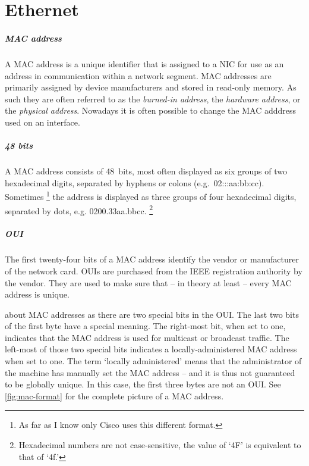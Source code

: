 \chapter{Ethernet}
\label{chap:ethernet}

\paragraph{\acs{MAC} address}
A \ac{MAC} address is a unique identifier that is assigned to a \ac{NIC} for use as an address in communication within a network segment.
\ac{MAC} addresses are primarily assigned by device manufacturers and stored in read-only memory.
As such they are often referred to as the \emph{burned-in address}, the \emph{hardware address}, or the \emph{physical address}.
Nowadays it is often possible to change the \acs{MAC} adddress used on an interface.

\paragraph{48 bits}
A \ac{MAC} address consists of 48~bits, most often displayed as six groups of two hexadecimal digits, separated by hyphens or colons (e.g.~02:::\-aa:\-bb:\-cc).
Sometimes%
   \footnote{As far as I know only Cisco uses this different format.}
the address is displayed as three groups of four hexadecimal digits, separated by dots, e.g. 0200.33aa.bbcc.%
   \footnote{Hexadecimal numbers are not case-sensitive, the value of `4F' is equivalent to that of `4f.'}

\paragraph{\acl{OUI}}
The first twenty-four bits of a \ac{MAC} address identify the vendor or manufacturer of the network card.
\Acp{OUI} are purchased from the \acs{IEEE} registration authority by the vendor.
They are used to make sure that -- in theory at least -- every \acs{MAC} address is unique.

 about \acs{MAC} addresses as there are two special bits in the \acs{OUI}.
The last two bits of the first byte have a special meaning.
The right-most bit, when set to one, indicates that the \acs{MAC} address is used for multicast or broadcast traffic.
The left-most of those two special bits indicates a locally-administered \acs{MAC} address when set to one.
The term `locally administered' means that the administrator of the machine has manually set the \acs{MAC} address -- and it is thus not guaranteed to be globally unique.
In this case, the first three bytes are not an \acl{OUI}.
See \cref{fig:mac-format} for the complete picture of a \acs{MAC} address.


